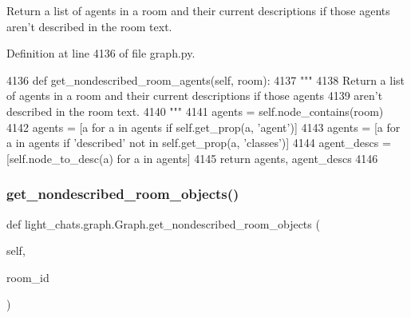 \begin{DoxyVerb}Return a list of agents in a room and their current descriptions if those agents
aren't described in the room text.
\end{DoxyVerb}
 

Definition at line 4136 of file graph.\+py.


\begin{DoxyCode}
4136     \textcolor{keyword}{def }get\_nondescribed\_room\_agents(self, room):
4137         \textcolor{stringliteral}{"""}
4138 \textcolor{stringliteral}{        Return a list of agents in a room and their current descriptions if those agents}
4139 \textcolor{stringliteral}{        aren't described in the room text.}
4140 \textcolor{stringliteral}{        """}
4141         agents = self.node\_contains(room)
4142         agents = [a \textcolor{keywordflow}{for} a \textcolor{keywordflow}{in} agents \textcolor{keywordflow}{if} self.get\_prop(a, \textcolor{stringliteral}{'agent'})]
4143         agents = [a \textcolor{keywordflow}{for} a \textcolor{keywordflow}{in} agents \textcolor{keywordflow}{if} \textcolor{stringliteral}{'described'} \textcolor{keywordflow}{not} \textcolor{keywordflow}{in} self.get\_prop(a, \textcolor{stringliteral}{'classes'})]
4144         agent\_descs = [self.node\_to\_desc(a) \textcolor{keywordflow}{for} a \textcolor{keywordflow}{in} agents]
4145         \textcolor{keywordflow}{return} agents, agent\_descs
4146 
\end{DoxyCode}
\mbox{\label{classlight__chats_1_1graph_1_1Graph_a3830f1a541b3a892a6e37c314b5b5205}} 
\subsubsection{\texorpdfstring{get\+\_\+nondescribed\+\_\+room\+\_\+objects()}{get\_nondescribed\_room\_objects()}}
{\footnotesize\ttfamily def light\+\_\+chats.\+graph.\+Graph.\+get\+\_\+nondescribed\+\_\+room\+\_\+objects (\begin{DoxyParamCaption}\item[{}]{self,  }\item[{}]{room\+\_\+id }\end{DoxyParamCaption})}

